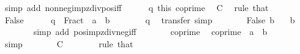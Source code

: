 \begin{isabellebody}
\ {\isacharparenleft}{\kern0pt}simp\ add{\isacharcolon}{\kern0pt}\ nonneg{}{\isacharunderscore}{\kern0pt}imp{\isacharunderscore}{\kern0pt}zdiv{\isacharunderscore}{\kern0pt}pos{\isacharunderscore}{\kern0pt}iff{\isacharparenright}{\kern0pt}\isanewline
\ \ \ \ \isamarkupfalse%
\ q{}\ this\ coprime\ \isamarkupfalse%
\ C\ \isamarkupfalse%
\ {\isacharparenleft}{\kern0pt}rule\ that{\isacharparenright}{\kern0pt}\isanewline
\ \ \isamarkupfalse%
\isanewline
\ \ \ \ \isamarkupfalse%
\ False\isanewline
\ \ \ \ \isamarkupfalse%
\ {\isachardoublequoteopen}q\ {\isacharequal}{\kern0pt}\ Fract\ {\isacharparenleft}{\kern0pt}{\isacharminus}{\kern0pt}\ {\isacharquery}{\kern0pt}a{\isacharparenright}{\kern0pt}\ {\isacharparenleft}{\kern0pt}{\isacharminus}{\kern0pt}\ {\isacharquery}{\kern0pt}b{\isacharparenright}{\kern0pt}{\isachardoublequoteclose}\isanewline
\ \ \ \ \ \ \isamarkupfalse%
\ q{}\ \isamarkupfalse%
\ transfer\ simp\isanewline
\ \ \ \ \isamarkupfalse%
\ \isamarkupfalse%
\ False\ b\ \isamarkupfalse%
\ {\isachardoublequoteopen}{\isacharminus}{\kern0pt}\ {\isacharquery}{\kern0pt}b\ {\isachargreater}{\kern0pt}\ {}{\isachardoublequoteclose}\isanewline
\ \ \ \ \ \ \isamarkupfalse%
\ {\isacharparenleft}{\kern0pt}simp\ add{\isacharcolon}{\kern0pt}\ pos{\isacharunderscore}{\kern0pt}imp{\isacharunderscore}{\kern0pt}zdiv{\isacharunderscore}{\kern0pt}neg{\isacharunderscore}{\kern0pt}iff{\isacharparenright}{\kern0pt}\isanewline
\ \ \ \ \isamarkupfalse%
\ \isamarkupfalse%
\ coprime\ \isamarkupfalse%
\ {\isachardoublequoteopen}coprime\ {\isacharparenleft}{\kern0pt}{\isacharminus}{\kern0pt}\ {\isacharquery}{\kern0pt}a{\isacharparenright}{\kern0pt}\ {\isacharparenleft}{\kern0pt}{\isacharminus}{\kern0pt}\ {\isacharquery}{\kern0pt}b{\isacharparenright}{\kern0pt}{\isachardoublequoteclose}\isanewline
\ \ \ \ \ \ \isamarkupfalse%
\ simp\isanewline
\ \ \ \ \isamarkupfalse%
\ \isamarkupfalse%
\ C\isanewline
\ \ \ \ \ \ \isamarkupfalse%
\ {\isacharparenleft}{\kern0pt}rule\ that{\isacharparenright}{\kern0pt}\isanewline
\ \ \isamarkupfalse%
\isanewline
{}\isamarkupfalse%
%
\endisatagproof
{\isafoldproof}%
%
\isadelimproof
\isanewline
%
\endisadelimproof
\isanewline
{}\isamarkupfalse%

\end{isabellebody}
